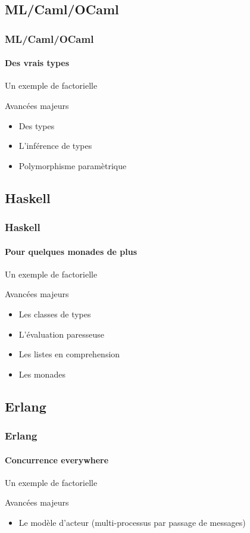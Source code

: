 \documentclass[t,12pt]{beamer}
\begin{document}
\subsection{ML/Caml/OCaml}
\begin{frame}
  \frametitle{ML/Caml/OCaml}
  \framesubtitle{Des vrais types}

  \begin{exampleblock}{Un exemple de factorielle}
    \ocamlFact
  \end{exampleblock}

  \begin{block}{Avancées majeurs}
    \begin{itemize}
      \item Des types
      \item L'inférence de types
      \item Polymorphisme paramètrique
    \end{itemize}
  \end{block}
\end{frame}

\subsection{Haskell}
\begin{frame}
  \frametitle{Haskell}
  \framesubtitle{Pour quelques monades de plus}

  \begin{exampleblock}{Un exemple de factorielle}
    \haskellFact
  \end{exampleblock}

  \begin{block}{Avancées majeurs}
    \begin{itemize}
      \item Les classes de types
      \item L'évaluation paresseuse
      \item Les listes en comprehension
      \item Les monades
    \end{itemize}
  \end{block}
\end{frame}

\subsection{Erlang}
\begin{frame}
  \frametitle{Erlang}
  \framesubtitle{Concurrence everywhere}

  \begin{exampleblock}{Un exemple de factorielle}
    \erlangFact
  \end{exampleblock}

  \begin{block}{Avancées majeurs}
    \begin{itemize}
      \item Le modèle d'acteur (multi-processus par passage de messages)
    \end{itemize}
  \end{block}
\end{frame}
\end{document}
